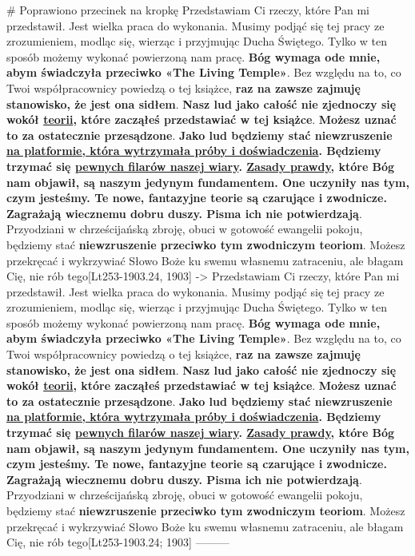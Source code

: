 # Poprawiono przecinek na kropkę
{Przedstawiam Ci rzeczy, które Pan mi przedstawił. Jest wielka praca do wykonania. Musimy podjąć się tej pracy ze zrozumieniem, modląc się, wierząc i przyjmując Ducha Świętego. Tylko w ten sposób możemy wykonać powierzoną nam pracę. \textbf{Bóg wymaga ode mnie, abym świadczyła przeciwko «The Living Temple»}. Bez względu na to, co Twoi współpracownicy powiedzą o tej książce, \textbf{raz na zawsze zajmuję stanowisko, że jest ona sidłem}. \textbf{Nasz lud jako całość nie zjednoczy się wokół \underline{teorii}, które zacząłeś przedstawiać w tej książce}. \textbf{Możesz uznać to za ostatecznie przesądzone}. \textbf{Jako lud będziemy stać niewzruszenie \underline{na platformie, która wytrzymała próby i doświadczenia}. Będziemy trzymać się \underline{pewnych filarów naszej wiary}. \underline{Zasady prawdy}, które Bóg nam objawił, są naszym jedynym fundamentem. One uczyniły nas tym, czym jesteśmy. Te nowe, fantazyjne teorie są czarujące i zwodnicze. Zagrażają wiecznemu dobru duszy. Pisma ich nie potwierdzają}. Przyodziani w chrześcijańską zbroję, obuci w gotowość ewangelii pokoju, będziemy stać \textbf{niewzruszenie przeciwko tym zwodniczym teoriom}. Możesz przekręcać i wykrzywiać Słowo Boże ku swemu własnemu zatraceniu, ale błagam Cię, nie rób tego}[Lt253-1903.24, 1903]
->
{Przedstawiam Ci rzeczy, które Pan mi przedstawił. Jest wielka praca do wykonania. Musimy podjąć się tej pracy ze zrozumieniem, modląc się, wierząc i przyjmując Ducha Świętego. Tylko w ten sposób możemy wykonać powierzoną nam pracę. \textbf{Bóg wymaga ode mnie, abym świadczyła przeciwko «The Living Temple»}. Bez względu na to, co Twoi współpracownicy powiedzą o tej książce, \textbf{raz na zawsze zajmuję stanowisko, że jest ona sidłem}. \textbf{Nasz lud jako całość nie zjednoczy się wokół \underline{teorii}, które zacząłeś przedstawiać w tej książce}. \textbf{Możesz uznać to za ostatecznie przesądzone}. \textbf{Jako lud będziemy stać niewzruszenie \underline{na platformie, która wytrzymała próby i doświadczenia}. Będziemy trzymać się \underline{pewnych filarów naszej wiary}. \underline{Zasady prawdy}, które Bóg nam objawił, są naszym jedynym fundamentem. One uczyniły nas tym, czym jesteśmy. Te nowe, fantazyjne teorie są czarujące i zwodnicze. Zagrażają wiecznemu dobru duszy. Pisma ich nie potwierdzają}. Przyodziani w chrześcijańską zbroję, obuci w gotowość ewangelii pokoju, będziemy stać \textbf{niewzruszenie przeciwko tym zwodniczym teoriom}. Możesz przekręcać i wykrzywiać Słowo Boże ku swemu własnemu zatraceniu, ale błagam Cię, nie rób tego}[Lt253-1903.24; 1903]
---------

